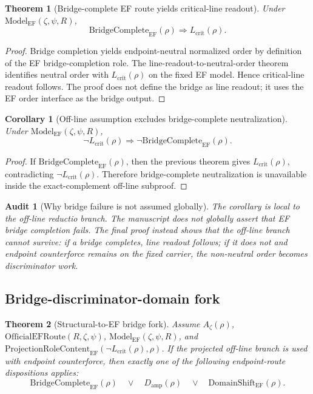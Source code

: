 \documentclass[11pt]{article}
\newtheorem{theorem}{Theorem}[section]
\newtheorem{corollary}{Corollary}[section]
\newtheorem{audit}{Audit}[section]
\newcommand{\Az}{A_{\zeta}}
\newcommand{\Lcrit}{L_{\mathrm{crit}}}
\newcommand{\ModelEF}{\mathrm{Model}_{\mathrm{EF}}}
\newcommand{\OfficialEFRoute}{\mathrm{OfficialEFRoute}}
\newcommand{\Damp}{D_{\mathrm{amp}}}
\newcommand{\ProjRoleEF}{\mathrm{ProjectionRoleContent}_{\mathrm{EF}}}
\newcommand{\BridgeCompleteEF}{\mathrm{BridgeComplete}_{\mathrm{EF}}}
\newcommand{\DomainShiftEF}{\mathrm{DomainShift}_{\mathrm{EF}}}
\begin{document}
\begin{theorem}[Bridge-complete EF route yields critical-line readout]
Under \(\ModelEF(\zeta,\psi,R)\),
\[
\BridgeCompleteEF(\rho)\Rightarrow \Lcrit(\rho).
\]
\end{theorem}

\begin{proof}
Bridge completion yields endpoint-neutral normalized order by definition of the EF bridge-completion role.  The line-readout-to-neutral-order theorem identifies neutral order with \(\Lcrit(\rho)\) on the fixed EF model.  Hence critical-line readout follows.  The proof does not define the bridge as line readout; it uses the EF order interface as the bridge output.
\end{proof}

\begin{corollary}[Off-line assumption excludes bridge-complete neutralization]
Under \(\ModelEF(\zeta,\psi,R)\),
\[
\neg\Lcrit(\rho)\Rightarrow \neg\BridgeCompleteEF(\rho).
\]
\end{corollary}

\begin{proof}
If \(\BridgeCompleteEF(\rho)\), then the previous theorem gives \(\Lcrit(\rho)\), contradicting \(\neg\Lcrit(\rho)\).  Therefore bridge-complete neutralization is unavailable inside the exact-complement off-line subproof.
\end{proof}

\begin{audit}[Why bridge failure is not assumed globally]
The corollary is local to the off-line reductio branch.  The manuscript does not globally assert that EF bridge completion fails.  The final proof instead shows that the off-line branch cannot survive: if a bridge completes, line readout follows; if it does not and endpoint counterforce remains on the fixed carrier, the non-neutral order becomes discriminator work.
\end{audit}

\subsection{Bridge-discriminator-domain fork}

\begin{theorem}[Structural-to-EF bridge fork]
Assume \(\Az(\rho)\), \(\OfficialEFRoute(R,\zeta,\psi)\), \(\ModelEF(\zeta,\psi,R)\), and \(\ProjRoleEF(\neg\Lcrit(\rho),\rho)\).  If the projected off-line branch is used with endpoint counterforce, then exactly one of the following endpoint-route dispositions applies:
\[
\BridgeCompleteEF(\rho)\quad\vee\quad \Damp(\rho)\quad\vee\quad \DomainShiftEF(\rho).
\]
\end{theorem}
\end{document}
